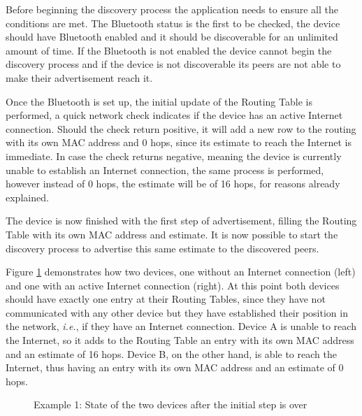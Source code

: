 Before beginning the discovery process the application needs to ensure all the conditions are met. The Bluetooth status is the first to be checked, the device should have Bluetooth enabled and it should be discoverable for an unlimited amount of time. If the Bluetooth is not enabled the device cannot begin the discovery process and if the device is not discoverable its peers are not able to make their advertisement reach it.

Once the Bluetooth is set up, the initial update of the Routing Table is performed, a quick network check indicates if the device has an active Internet connection. Should the check return positive, it will add a new row to the routing with its own \gls{MAC} address and 0 hops, since its estimate to reach the Internet is immediate. In case the check returns negative, meaning the device is currently unable to establish an Internet connection, the same process is performed, however instead of 0 hops, the estimate will be of 16 hops, for reasons already explained.

The device is now finished with the first step of advertisement, filling the Routing Table with its own \gls{MAC} address and estimate. It is now possible to start the discovery process to advertise this same estimate to the discovered peers.

Figure \ref{fig:adveg1} demonstrates how two devices, one without an Internet connection (left) and one with an active Internet connection (right). At this point both devices should have exactly one entry at their Routing Tables, since they have not communicated with any other device but they have established their position in the network, \textit{i.e.}, if they have an Internet connection. Device A is unable to reach the Internet, so it adds to the Routing Table an entry with its own \gls{MAC} address and an estimate of 16 hops. Device B, on the other hand, is able to reach the Internet, thus having an entry with its own \gls{MAC} address and an estimate of 0 hops.

\begin{figure}[ht]
   \noindent{}
	\caption{\label{fig:adveg1} Example 1: State of the two devices after the initial step is over}
\end{figure}

